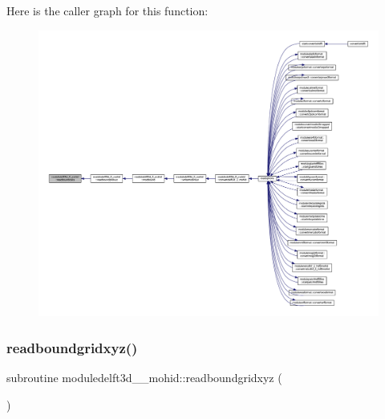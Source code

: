 Here is the caller graph for this function\+:\nopagebreak
\begin{figure}[H]
\begin{center}
\leavevmode
\includegraphics[width=350pt]{namespacemoduledelft3d__2__mohid_abd4423475ad3b1f766d3bfe7af38a4ae_icgraph}
\end{center}
\end{figure}
\mbox{\label{namespacemoduledelft3d__2__mohid_a07dc591a7f52b875d18aee392df1d13d}} 
\subsubsection{\texorpdfstring{readboundgridxyz()}{readboundgridxyz()}}
{\footnotesize\ttfamily subroutine moduledelft3d\+\_\+\_\+mohid\+::readboundgridxyz (\begin{DoxyParamCaption}{ }\end{DoxyParamCaption})\hspace{0.3cm}{\ttfamily [private]}}

